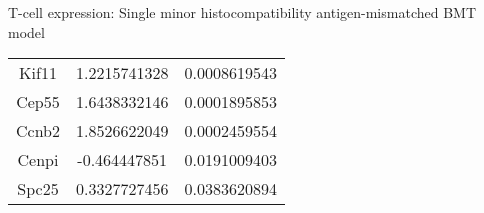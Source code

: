 \documentclass[final,hyperref={pdfpagelabels=false}]{beamer}
\begin{document}
\begin{frame}{}
\begin{columns}[t]
\begin{column}{.25\linewidth}
\begin{block}{T-cell expression: Single minor histocompatibility antigen-mismatched BMT model}
{\begin{tabular}{ |c|c|c| }
Kif11 &	1.2215741328 &	0.0008619543 \\ %
Cep55 &	1.6438332146 &	0.0001895853 \\ %
Ccnb2 &	1.8526622049 &	0.0002459554 \\ %
Cenpi &	-0.464447851 &	0.0191009403 \\
Spc25 &	0.3327727456 &	0.0383620894 \\

	      \hline
	    \end{tabular} }


\end{block}
\end{column}
\end{columns}
\end{frame}
\end{document}
